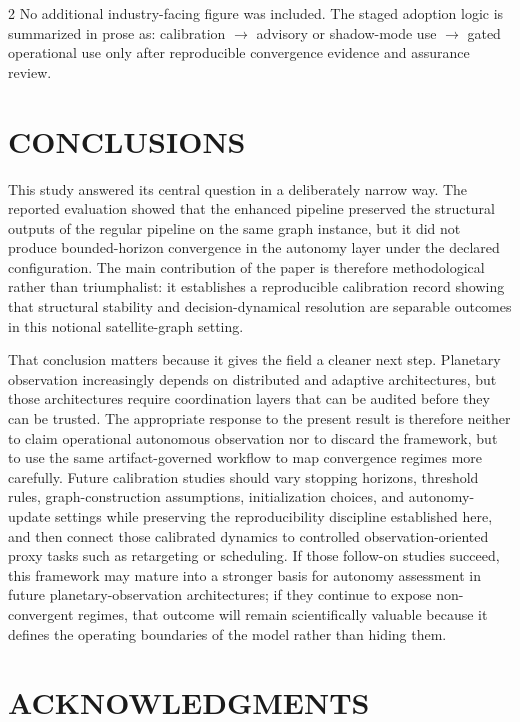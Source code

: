 \documentclass[fleqn,10pt,letterpaper]{article}
\begin{document}
\begin{multicols}{2}
No additional industry-facing figure was included. The staged adoption logic is summarized in prose as: calibration $\rightarrow$ advisory or shadow-mode use $\rightarrow$ gated operational use only after reproducible convergence evidence and assurance review.


\section{CONCLUSIONS}

This study answered its central question in a deliberately narrow way. The reported evaluation showed that the enhanced pipeline preserved the structural outputs of the regular pipeline on the same graph instance, but it did not produce bounded-horizon convergence in the autonomy layer under the declared configuration. The main contribution of the paper is therefore methodological rather than triumphalist: it establishes a reproducible calibration record showing that structural stability and decision-dynamical resolution are separable outcomes in this notional satellite-graph setting.

That conclusion matters because it gives the field a cleaner next step. Planetary observation increasingly depends on distributed and adaptive architectures, but those architectures require coordination layers that can be audited before they can be trusted. The appropriate response to the present result is therefore neither to claim operational autonomous observation nor to discard the framework, but to use the same artifact-governed workflow to map convergence regimes more carefully. Future calibration studies should vary stopping horizons, threshold rules, graph-construction assumptions, initialization choices, and autonomy-update settings while preserving the reproducibility discipline established here, and then connect those calibrated dynamics to controlled observation-oriented proxy tasks such as retargeting or scheduling. If those follow-on studies succeed, this framework may mature into a stronger basis for autonomy assessment in future planetary-observation architectures; if they continue to expose non-convergent regimes, that outcome will remain scientifically valuable because it defines the operating boundaries of the model rather than hiding them.


\section*{ACKNOWLEDGMENTS}


\end{multicols}
\end{document}
